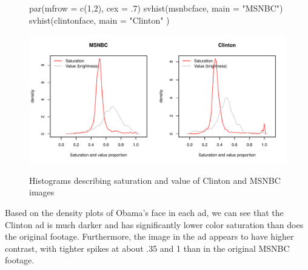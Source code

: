 \documentclass[12pt]{article}
\begin{document}
\begin{figure}[ht]
\caption{Histograms describing saturation and value of Clinton and MSNBC images}
\begin{Schunk}
\begin{Sinput}
 par(mfrow = c(1,2), cex = .7)
 svhist(msnbcface, main = "MSNBC")
 svhist(clintonface, main = "Clinton" )
\end{Sinput}
\end{Schunk}
\includegraphics{ImageMetrics-svhist}
\label{fig:clmsn}
\end{figure}

Based on the density plots of Obama's face in each ad, we can see that the Clinton ad is much darker and has significantly lower color saturation than does the original footage.  Furthermore, the image in the ad appears to have higher contrast, with tighter spikes at about .35 and 1 than in the original MSNBC footage.      

\newpage


  
\end{document}
